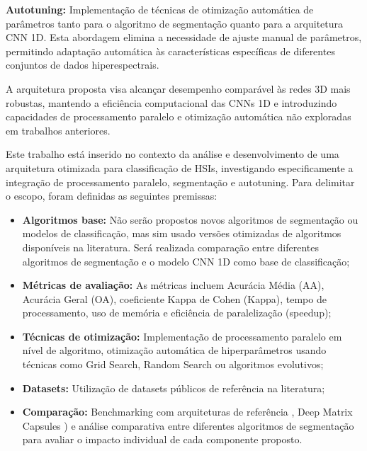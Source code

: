 \documentclass[a4paper,12pt,brazil]{article} %
\begin{document}
\textbf{Autotuning:} Implementação de técnicas de otimização automática de parâmetros tanto para o algoritmo de segmentação quanto para a arquitetura CNN 1D. Esta abordagem elimina a necessidade de ajuste manual de parâmetros, permitindo adaptação automática às características específicas de diferentes conjuntos de dados hiperespectrais.

A arquitetura proposta visa alcançar desempenho comparável às redes 3D mais robustas, mantendo a eficiência computacional das CNNs 1D e introduzindo capacidades de processamento paralelo e otimização automática não exploradas em trabalhos anteriores.

Este trabalho está inserido no contexto da análise e desenvolvimento de uma arquitetura otimizada para classificação de HSIs, investigando especificamente a integração de processamento paralelo, segmentação e autotuning. Para delimitar o escopo, foram definidas as seguintes premissas:

\begin{itemize}
\item \textbf{Algoritmos base:} Não serão propostos novos algoritmos de segmentação ou modelos de classificação, mas sim usado versões otimizadas de algoritmos disponíveis na literatura. Será realizada comparação entre diferentes algoritmos de segmentação e o modelo CNN 1D como base de classificação;

\item \textbf{Métricas de avaliação:} As métricas incluem Acurácia Média (AA), Acurácia Geral (OA), coeficiente Kappa de Cohen (Kappa), tempo de processamento, uso de memória e eficiência de paralelização (speedup);

\item \textbf{Técnicas de otimização:} Implementação de processamento paralelo em nível de algoritmo, otimização automática de hiperparâmetros usando técnicas como Grid Search, Random Search ou algoritmos evolutivos;

\item \textbf{Datasets:} Utilização de datasets públicos de referência na literatura;

\item \textbf{Comparação:} Benchmarking com arquiteturas de referência \cite{roy2020hybridsn}, Deep Matrix Capsules \cite{ravikumar2022hyperspectral}) e análise comparativa entre diferentes algoritmos de segmentação para avaliar o impacto individual de cada componente proposto.
\end{itemize}
\end{document}
